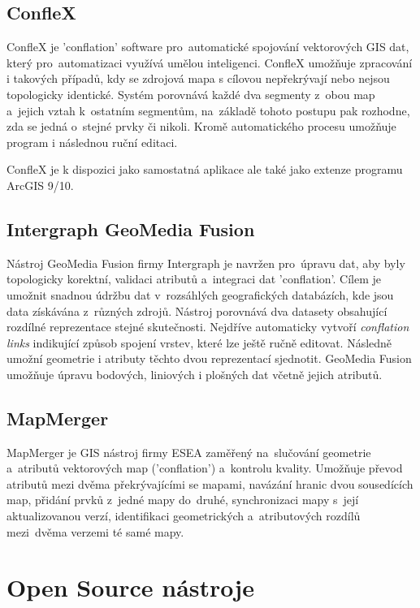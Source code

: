 \subsection{ConfleX}
\label{conflex}

ConfleX je 'conflation' software pro~automatické spojování vektorových GIS dat, který pro~automatizaci využívá umělou inteligenci. ConfleX umožňuje zpracování i takových 
případů, kdy se zdrojová mapa s cílovou nepřekrývají nebo nejsou topologicky identické. Systém porovnává každé dva segmenty z~obou map a~jejich vztah k~ostatním segmentům, 
na~základě tohoto postupu pak rozhodne, zda se jedná o~stejné prvky či nikoli. Kromě automatického procesu umožňuje program i následnou ruční editaci.

ConfleX je k dispozici jako samostatná aplikace ale také jako extenze programu ArcGIS 9/10.

\subsection{Intergraph GeoMedia Fusion}
\label{geomedia}

Nástroj GeoMedia Fusion firmy Intergraph je navržen pro~úpravu dat, aby byly topologicky korektní, validaci atributů a~integraci dat 'conflation'. Cílem je umožnit snadnou 
údržbu dat v~rozsáhlých geografických databázích, kde jsou data získávána z~různých zdrojů. Nástroj porovnává dva datasety obsahující rozdílné reprezentace stejné skutečnosti.
Nejdříve automaticky vytvoří \textit{conflation links} indikující způsob spojení vrstev, které lze ještě ručně editovat. Následně umožní geometrie i atributy těchto dvou 
reprezentací sjednotit. GeoMedia Fusion umožňuje úpravu bodových, liniových i plošných dat včetně jejich atributů.


\subsection{MapMerger}
\label{mapmerger}

MapMerger je GIS nástroj firmy ESEA zaměřený na~slučování geometrie a~atributů vektorových map ('conflation') a~kontrolu kvality. Umožňuje převod atributů 
mezi dvěma překrývajícími se mapami, navázání hranic dvou sousedících map, přidání prvků z~jedné mapy do~druhé, synchronizaci mapy s~její aktualizovanou verzí, 
identifikaci geometrických a~atributových rozdílů mezi~dvěma verzemi té samé mapy. 

\section{Open Source nástroje}
\label{open-source}

